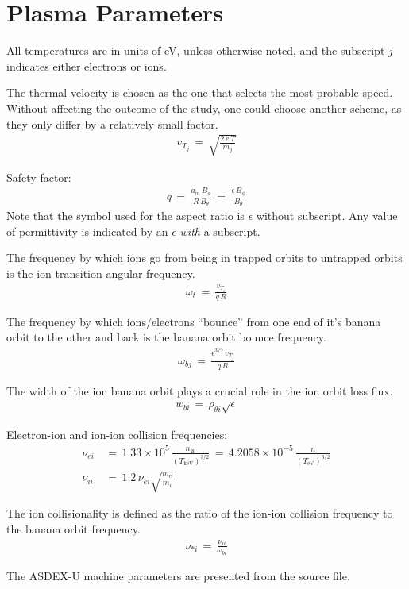 \chapter{Plasma Parameters}\label{chapter:Plasma_Parameters}

All temperatures are in units of eV, unless otherwise noted, and the subscript $j$ indicates either electrons or ions.

The thermal velocity is chosen as the one that selects the most probable speed.
Without affecting the outcome of the study, one could choose another scheme, as they only differ by a relatively small factor.
\begin{align}
	v_{T_j} \,=\, \sqrt{\frac{2 \, e \, T}{m_j}}
		\label{eq:thermal_velocity}
\end{align}

Safety factor:
\begin{align}
	q \,=\, \frac{a_m \, B_\phi}{R \, B_\theta} \,=\,
		\frac{\epsilon \, B_\phi}{B_\theta} \label{eq:safety_factor}
\end{align}
Note that the symbol used for the aspect ratio is $\epsilon$ without subscript.
Any value of permittivity is indicated by an $\epsilon$ \emph{with} a subscript.

The frequency by which ions go from being in trapped orbits to untrapped orbits is the ion transition angular frequency.
\begin{align}
	\omega_t \,=\, \frac{v_{T_i}}{q \, R} \label{eq:transition_freq}
\end{align}

The frequency by which ions/electrons ``bounce'' from one end of it's banana orbit to the other and back is the banana orbit bounce frequency.
\begin{align}
	\omega_{bj} \,=\, \frac{\epsilon^{3/2} \, v_{T_j}}{q \, R}
		\label{eq:banana_bounce_freq}
\end{align}

The width of the ion banana orbit plays a crucial role in the ion orbit loss flux.
\begin{align}
	w_{bi} \,=\, \rho_{\theta i} \sqrt{\epsilon} \label{eq:banana_width}
\end{align}

Electron-ion and ion-ion collision frequencies:
\begin{align}
	\nu_{ei} \,&=\, 1.33\times 10^5 \, \frac{n_{20}}{(T_\text{keV})^{3/2}}
		\,=\, 4.2058\times 10^{-5} \, \frac{n}{(T_\text{eV})^{3/2}}
		\label{eq:nu_ei} \\
	\nu_{ii} \,&=\, 1.2 \, \nu_{ei} \sqrt{\frac{m_e}{m_i}} \label{eq:nu_ii}
\end{align}

The ion collisionality is defined as the ratio of the ion-ion collision frequency to the banana orbit frequency.
\begin{align}
	\nu_{*i} \,=\, \frac{\nu_{ii}}{\omega_{bi}} \label{eq:collisionality}
\end{align}

The ASDEX-U machine parameters are presented from the source file.
\inputminted[firstline=24, lastline=33, tabsize=4, breaklines=true, fontsize=\footnotesize, frame=single, linenos=true]{python}{../FiPy_Model/parameters.py}

